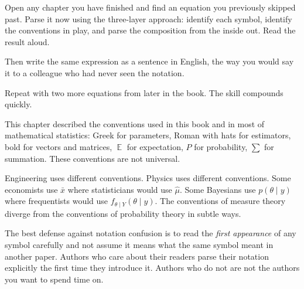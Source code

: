 \documentclass[
  letterpaper,
  11pt,
  twoside,
  openany]{scrbook}
\newcommand{\E}{\operatorname{\mathbb{E}}}
\begin{document}
\begin{tcolorbox}[enhanced jigsaw, arc=.35mm, bottomrule=.15mm, bottomtitle=1mm, breakable, colback=white, colbacktitle=quarto-callout-tip-color!10!white, colframe=quarto-callout-tip-color-frame, coltitle=black, left=2mm, leftrule=.75mm, opacityback=0, opacitybacktitle=0.6, rightrule=.15mm, title=\textcolor{quarto-callout-tip-color}{\faLightbulb}\hspace{0.5em}{Try this}, titlerule=0mm, toprule=.15mm, toptitle=1mm]

Open any chapter you have finished and find an equation you previously
skipped past. Parse it now using the three-layer approach: identify each
symbol, identify the conventions in play, and parse the composition from
the inside out. Read the result aloud.

Then write the same expression as a sentence in English, the way you
would say it to a colleague who had never seen the notation.

Repeat with two more equations from later in the book. The skill
compounds quickly.

\end{tcolorbox}

\begin{tcolorbox}[enhanced jigsaw, arc=.35mm, bottomrule=.15mm, bottomtitle=1mm, breakable, colback=white, colbacktitle=quarto-callout-note-color!10!white, colframe=quarto-callout-note-color-frame, coltitle=black, left=2mm, leftrule=.75mm, opacityback=0, opacitybacktitle=0.6, rightrule=.15mm, title=\textcolor{quarto-callout-note-color}{\faInfo}\hspace{0.5em}{Inside the math: the conventions are not universal}, titlerule=0mm, toprule=.15mm, toptitle=1mm]

This chapter described the conventions used in this book and in most of
mathematical statistics: Greek for parameters, Roman with hats for
estimators, bold for vectors and matrices, \(\E\) for expectation, \(P\)
for probability, \(\sum\) for summation. These conventions are not
universal.

Engineering uses different conventions. Physics uses different
conventions. Some economists use \(\bar{x}\) where statisticians would
use \(\hat\mu\). Some Bayesians use \(p(\theta \mid y)\) where
frequentists would use \(f_{\theta \mid Y}(\theta \mid y)\). The
conventions of measure theory diverge from the conventions of
probability theory in subtle ways.

The best defense against notation confusion is to read the \emph{first
appearance} of any symbol carefully and not assume it means what the
same symbol meant in another paper. Authors who care about their readers
parse their notation explicitly the first time they introduce it.
Authors who do not are not the authors you want to spend time on.

\end{tcolorbox}
\end{document}
